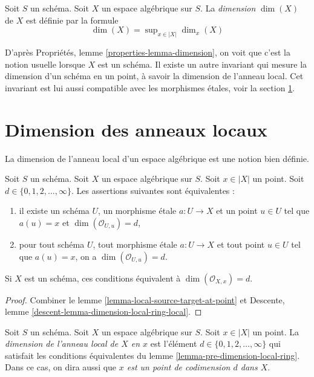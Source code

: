 \begin{definition}
\label{definition-dimension}
Soit $S$ un schéma. Soit $X$ un espace algébrique sur $S$.
La {\it dimension} $\dim(X)$ de $X$ est définie par la formule
$$
\dim(X) = \sup\nolimits_{x \in |X|} \dim_x(X)
$$
\end{definition}

\noindent
D'après
Propriétés, lemme \ref{properties-lemma-dimension},
on voit que c'est la notion usuelle lorsque $X$ est un schéma.
Il existe un autre invariant qui mesure la dimension d'un schéma
en un point, à savoir la dimension de l'anneau local. Cet invariant
est lui aussi compatible avec les morphismes \'etales, voir la
section \ref{section-dimension-local-ring}.






\section{Dimension des anneaux locaux}
\label{section-dimension-local-ring}

\noindent
La dimension de l'anneau local d'un espace algébrique est une notion bien
définie.

\begin{lemma}
\label{lemma-pre-dimension-local-ring}
Soit $S$ un schéma.
Soit $X$ un espace algébrique sur $S$.
Soit $x \in |X|$ un point.
Soit $d \in \{0, 1, 2, \ldots, \infty\}$.
Les assertions suivantes sont équivalentes :
\begin{enumerate}
\item il existe un schéma $U$, un morphisme \'etale $a : U \to X$ et un point
$u \in U$ tel que $a(u) = x$ et $\dim(\mathcal{O}_{U, u}) = d$,
\item pour tout schéma $U$, tout morphisme \'etale $a : U \to X$ et tout point
$u \in U$ tel que $a(u) = x$, on a $\dim(\mathcal{O}_{U, u}) = d$.
\end{enumerate}
Si $X$ est un schéma, ces conditions équivalent à $\dim(\mathcal{O}_{X, x}) = d$.
\end{lemma}

\begin{proof}
Combiner le
lemme \ref{lemma-local-source-target-at-point} et
Descente, lemme \ref{descent-lemma-dimension-local-ring-local}.
\end{proof}

\begin{definition}
\label{definition-dimension-local-ring}
Soit $S$ un schéma. Soit $X$ un espace algébrique sur $S$. Soit $x \in |X|$
un point. La {\it dimension de l'anneau local de $X$ en $x$} est
l'élément $d \in \{0, 1, 2, \ldots, \infty\}$ qui satisfait les conditions
équivalentes du lemme \ref{lemma-pre-dimension-local-ring}. Dans ce cas, on
dira aussi que {\it $x$ est un point de codimension $d$ dans $X$}.
\end{definition}

